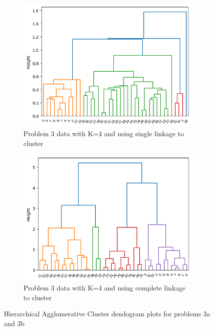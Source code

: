 \documentclass[12pt]{article}
\begin{document}
\begin{figure}
    \begin{subfigure}{0.5\textwidth}
        \centering
        \includegraphics[width=\linewidth]{../plots/3a_single_dendrogram.png}
        \caption{Problem 3 data with K=4 and using single linkage to cluster}
        \label{fig:single_linkage}
    \end{subfigure}
    \begin{subfigure}{0.5\textwidth}
        \centering
        \includegraphics[width=\linewidth]{../plots/3a_complete_dendrogram.png}
        \caption{Problem 3 data with K=4 and using complete linkage to cluster}
        \label{fig:complete_linkage}
    \end{subfigure}
    \caption{Hierarchical Agglomerative Cluster dendogram plots for problems 3a and 3b}\label{fig:3a_den}
\end{figure}
\end{document}
